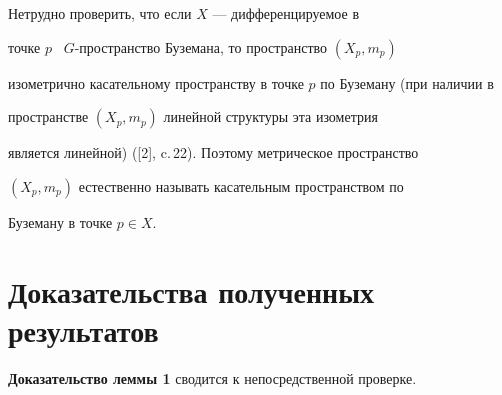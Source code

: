 \begin{notenonum}


Нетрудно проверить, что если $X$ --- дифференцируемое в


точке $p$ \ $G$-про\-ст\-ран\-ст\-во Буземана, то пространство $(X_{p},m_{p})$ 


изометрично касательному пространству в точке $p$ по Буземану (при наличии в


пространстве $(X_{p},m_{p})$ линейной структуры эта изометрия


является линейной) ([2], c.\,22). Поэтому метрическое пространство


$(X_{p},m_{p})$ естественно называть касательным пространством по


Буземану в точке $p \in X$.


\end{notenonum}








\section{Доказательства полученных результатов}





{\bf Доказательство леммы 1} сводится к непосредственной проверке.


\medskip





